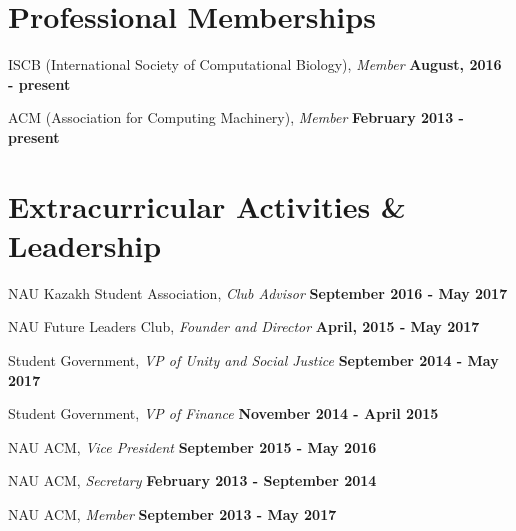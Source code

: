 \documentclass[margin,line]{res}
\begin{document}
\begin{resume}
%
%


\section{\sc Professional Memberships}
\begin{list2}
\item ISCB (International Society of Computational Biology), {\em Member} \hfill {\bf August, 2016 - present}
\item ACM (Association for Computing Machinery), {\em Member} \hfill  {\bf February 2013 - present}
\end{list2}


\section{\sc Extracurricular Activities \& Leadership}
\begin{list2}
\item NAU Kazakh Student Association, {\em Club Advisor} \hfill {\bf September 2016 - May 2017}
\item NAU Future Leaders Club, {\em Founder and Director} \hfill {\bf April, 2015 - May 2017}
\item Student Government, {\em VP of Unity and Social Justice} \hfill  {\bf September 2014 - May 2017}
\item Student Government, {\em VP of Finance} \hfill {\bf November 2014 - April 2015}
\item NAU ACM, {\em Vice President} \hfill  {\bf September 2015 - May 2016}
\item NAU ACM, {\em Secretary} \hfill  {\bf February 2013 - September 2014}
\item NAU ACM, {\em Member} \hfill {\bf September 2013 - May 2017}
\end{list2}



\end{resume}
\end{document}
